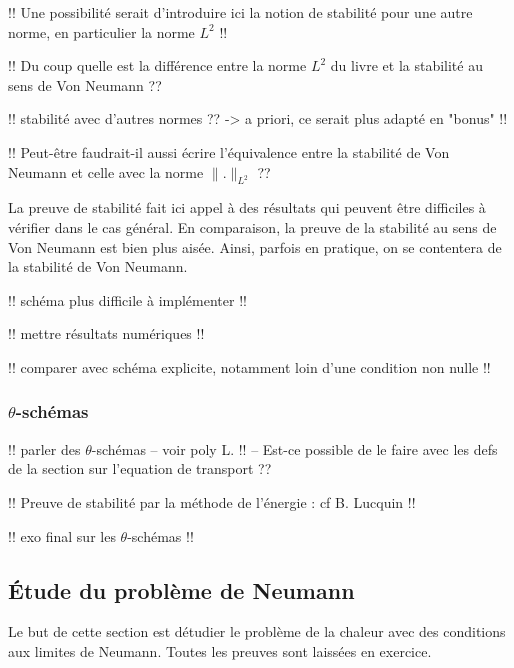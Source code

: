\documentclass[12pt,a4paper,twoside]{article}
\begin{document}
!! Une possibilit\'e serait d'introduire ici la notion de stabilit\'e pour une autre
norme, en particulier la norme $L^2$ !!

!! Du coup quelle est la diff\'erence entre la norme $L^2$ du livre
et la stabilit\'e au sens de Von Neumann ??

!! stabilit\'e avec d'autres normes ?? -> a priori, ce serait plus adapt\'e
en "bonus" !!


!! Peut-\^etre faudrait-il aussi \'ecrire l'\'equivalence entre la stabilit\'e de
Von Neumann et celle avec la norme $\| . \|_{L^2}$ ??

\begin{remark}
  La preuve de stabilit\'e fait ici appel \`a des r\'esultats qui peuvent \^etre
  difficiles \`a v\'erifier dans le cas g\'en\'eral.
  En comparaison, la preuve de la stabilit\'e au sens de Von Neumann est bien plus ais\'ee.
  Ainsi, parfois en pratique, on se contentera de la stabilit\'e de Von Neumann.
\end{remark}


\begin{remark}
  !! sch\'ema plus difficile \`a impl\'ementer !!

  !! mettre r\'esultats num\'eriques !!

  !! comparer avec sch\'ema explicite, notamment loin d'une condition non nulle !!
\end{remark}

\subsubsection{$\theta$-sch\'emas}

!! parler des $\theta$-sch\'emas -- voir poly L. !! 
-- Est-ce possible de le faire avec les defs de la section sur l'equation de transport ??

!! Preuve de stabilit\'e par la m\'ethode de l'\'energie : cf B. Lucquin !!


!! exo final sur les $\theta$-sch\'emas !!


\subsection{\'Etude du probl\`eme de Neumann}

Le but de cette section est d\'etudier le probl\`eme de la chaleur
avec des conditions aux limites de Neumann.
Toutes les preuves sont laiss\'ees en exercice.
\end{document}
